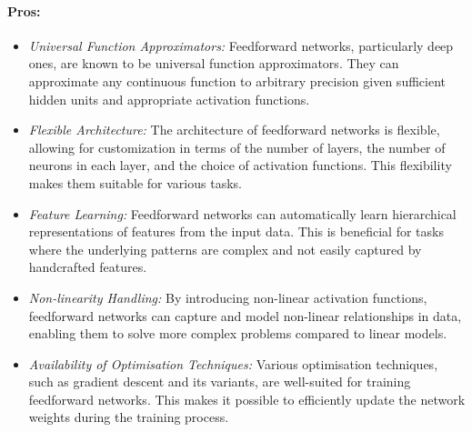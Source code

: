 \paragraph{Pros:}
\begin{itemize}
    \item \textit{Universal Function Approximators:}
    Feedforward networks, particularly deep ones, are known to be universal function approximators. They can approximate any continuous function to arbitrary precision given sufficient hidden units and appropriate activation functions.
    \item \textit{Flexible Architecture:} The architecture of feedforward networks is flexible, allowing for customization in terms of the number of layers, the number of neurons in each layer, and the choice of activation functions. This flexibility makes them suitable for various tasks.
    \item \textit{Feature Learning:} Feedforward networks can automatically learn hierarchical representations of features from the input data. This is beneficial for tasks where the underlying patterns are complex and not easily captured by handcrafted features.
    \item \textit{Non-linearity Handling:} By introducing non-linear activation functions, feedforward networks can capture and model non-linear relationships in data, enabling them to solve more complex problems compared to linear models.
    \item \textit{Availability of Optimisation Techniques:} Various optimisation techniques, such as gradient descent and its variants, are well-suited for training feedforward networks. This makes it possible to efficiently update the network weights during the training process.
\end{itemize}

